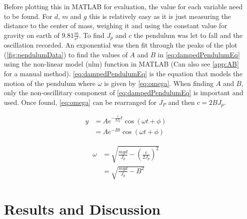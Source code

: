 \documentclass[a4paper, 11pt, compsoc]{IEEEtran}
\begin{document}
        Before plotting this in MATLAB for evaluation, the value for each variable need to be found. For $d$, $m$ and $g$ this is relatively easy as it is just measuring the distance to the center of mass, weighing it and using the constant value for gravity on earth of $9.81 \frac{m}{s^2}$. To find $J_p$ and $c$ the pendulum was let to fall and the oscillation recorded. An exponential was then fit through the peaks of the plot (\cref{fig:pendulumData}) to find the values of $A$ and $B$ in \cref{eq:dampedPendulumEq} using the non-linear model (nlm) function in MATLAB (Can also see \cref{app:AB} for a manual method). \cref{eq:dampedPendulumEq} is the equation that models the motion of the pendulum where $\omega$ is given by \cref{eq:omega}. When finding $A$ and $B$, only the non-oscillitary component of \cref{eq:dampedPendulumEq} is important and used. Once found, \cref{eq:omega} can be rearranged for $J_P$ and then $c = 2BJ_p$.
        
        \begin{equation}\label{eq:dampedPendulumEq}
            \begin{split}
                y & = A e^{-\frac{c}{2J_p}t} \cos(\omega t + \phi) \\
                  & = A e^{-Bt}\cos(\omega t + \phi) 
            \end{split}
        \end{equation}

        \begin{equation}\label{eq:omega}
            \begin{split}
                \omega & = \sqrt{\frac{mgd}{J_p} - \left(\frac{c}{2J_p}\right)^2} \\ 
                  & = \sqrt{\frac{mgd}{J_p} - B^2}
            \end{split}
        \end{equation}

    \section{Results and Discussion}\label{sec:results}
\end{document}
